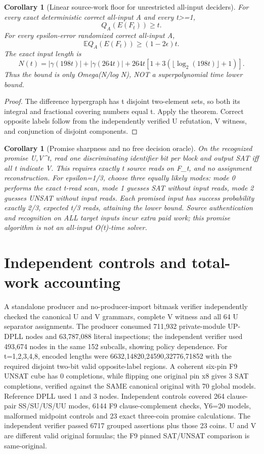 \documentclass[11pt]{article}
\newtheorem{corollary}[theorem]{Corollary}
\begin{document}
\begin{corollary}[Linear source-work floor for unrestricted all-input deciders]
For every exact deterministic correct all-input A and every t>=1,
\[
Q_A(E(F_t))\ge t.
\]
For every epsilon-error randomized correct all-input A,
\[
\mathbb E Q_A(E(F_t))\ge(1-2\epsilon)t.
\]
The exact input length is
\[
N(t)=|\gamma(198t)|+|\gamma(264t)|+264t[1+3(\lfloor\log_2(198t)\rfloor+1)].
\]
Thus the bound is only Omega(N/log N), NOT a superpolynomial time lower bound.
\end{corollary}
\begin{proof}
The difference hypergraph has t disjoint two-element sets, so both its integral and fractional covering numbers equal t. Apply the theorem. Correct opposite labels follow from the independently verified U refutation, V witness, and conjunction of disjoint components.
\end{proof}
\begin{corollary}[Promise sharpness and no free decision oracle]
On the recognized promise {U,V}^t, read one discriminating identifier bit per block and output SAT iff all t indicate V. This requires exactly t source reads on F_t, and no assignment reconstruction. For epsilon=1/3, choose three equally likely modes: mode 0 performs the exact t-read scan, mode 1 guesses SAT without input reads, mode 2 guesses UNSAT without input reads. Each promised input has success probability exactly 2/3, expected t/3 reads, attaining the lower bound. Source authentication and recognition on ALL target inputs incur extra paid work; this promise algorithm is not an all-input O(t)-time solver.
\end{corollary}

\section{Independent controls and total-work accounting}
A standalone producer and no-producer-import bitmask verifier independently checked the canonical U and V grammars, complete V witness and all 64 U separator assignments. The producer consumed 711,932 private-module UP-DPLL nodes and 63,787,088 literal inspections; the independent verifier used 493,674 nodes in the same 152 subcalls, showing policy dependence. For t=1,2,3,4,8, encoded lengths were 6632,14820,24590,32776,71852 with the required disjoint two-bit valid opposite-label regions. A coherent six-pin F9 UNSAT cube has 0 completions, while flipping one original pin x8 gives 3 SAT completions, verified against the SAME canonical original with 70 global models. Reference DPLL used 1 and 3 nodes. Independent controls covered 264 clause-pair SS/SU/US/UU modes, 6144 F9 clause-complement checks, Y6=20 models, malformed midpoint controls and 23 exact three-coin promise calculations. The independent verifier passed 6717 grouped assertions plus those 23 coins. U and V are different valid original formulas; the F9 pinned SAT/UNSAT comparison is same-original.
\end{document}

